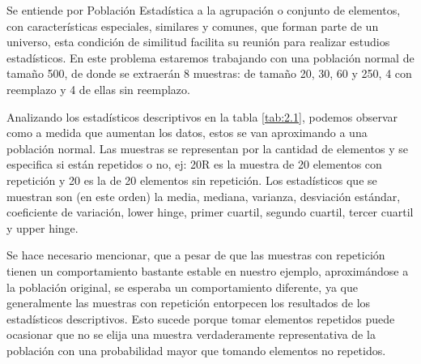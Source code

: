 \documentclass[a4paper,10pt,twocolumn]{report}
\begin{document}
	Se entiende por Población Estadística a la agrupación o conjunto de elementos, con características especiales, similares y comunes, que forman parte de un universo, esta condición de similitud facilita su reunión para realizar estudios estadísticos. En este problema estaremos trabajando con una población normal de tamaño 500, de donde se extraerán 8 muestras: de tamaño 20, 30, 60 y 250, 4 con reemplazo y 4 de ellas sin reemplazo.
	
	Analizando los estadísticos descriptivos en la tabla \ref{tab:2.1}, podemos observar como a medida que aumentan los datos, estos se van aproximando a una población normal. Las muestras se representan por la cantidad de elementos y se especifica si están repetidos o no, ej: 20R es la muestra de 20 elementos con repetición y 20 es la de 20 elementos sin repetición. Los estadísticos que se muestran son (en este orden) la media, mediana, varianza, desviación estándar, coeficiente de variación, lower hinge, primer cuartil, segundo cuartil, tercer cuartil y upper hinge.
	
	Se hace necesario mencionar, que a pesar de que las muestras con repetición tienen un comportamiento bastante estable en nuestro ejemplo, aproximándose a la población original, se esperaba un comportamiento diferente, ya que generalmente las muestras con repetición  entorpecen los resultados de los estadísticos descriptivos. Esto sucede porque tomar elementos repetidos puede ocasionar que no se elija una muestra verdaderamente representativa de la población con una probabilidad mayor que tomando elementos no repetidos.
	
\end{document}
